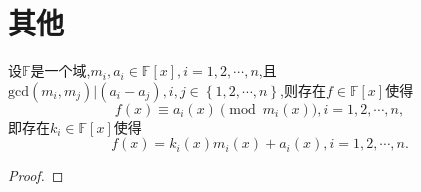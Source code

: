 \documentclass[../../main.tex]{subfiles}%
\begin{document}
\section{其他}

\begin{theorem}\label{theorem:中国剩余定理推广(模不互质的情况)}
设$\mathbb{F}$是一个域,$m_i,a_i\in \mathbb{F}[x],i=1,2,\cdots,n$,且$\mathrm{gcd}\left( m_i,m_j \right) |\left( a_i-a_j \right) ,i,j\in \left\{ 1,2,\cdots ,n \right\}$,则存在$f\in\mathbb{F}[x]$使得
$$
f(x)\equiv a_i(x)\pmod{m_i(x)},i=1,2,\cdots,n,
$$
即存在$k_i\in\mathbb{F}[x]$使得
$$
f(x)=k_i(x)m_i(x)+a_i(x),i=1,2,\cdots,n.
$$
\end{theorem}
\begin{proof}



\end{proof}
\end{document}
